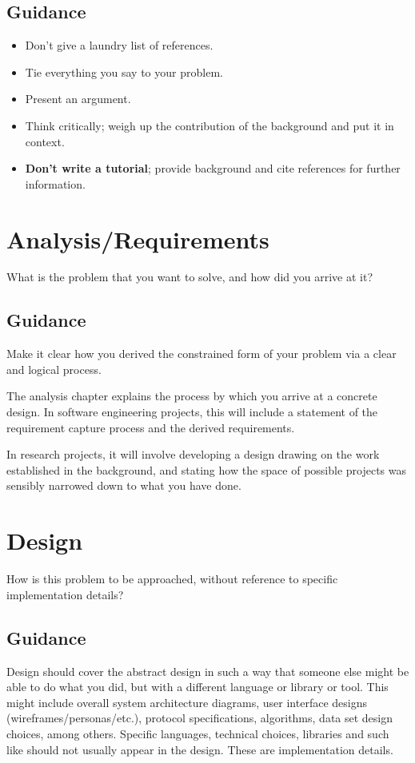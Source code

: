 \documentclass{l4proj}
\begin{document}
\section{Guidance}
\begin{itemize}    
    \item
      Don't give a laundry list of references.
    \item
      Tie everything you say to your problem.
    \item
      Present an argument.
    \item Think critically; weigh up the contribution of the background and put it in context.    
    \item
      \textbf{Don't write a tutorial}; provide background and cite
      references for further information.
\end{itemize}

\chapter{Analysis/Requirements}
What is the problem that you want to solve, and how did you arrive at it?
\section{Guidance}
Make it clear how you derived the constrained form of your problem via a clear and logical process. 

The analysis chapter explains the process by which you arrive at a concrete design. In software 
engineering projects, this will include a statement of the requirement capture process and the
derived requirements.

In research projects, it will involve developing a design drawing on
the work established in the background, and stating how the space of possible projects was
sensibly narrowed down to what you have done.

\chapter{Design}
How is this problem to be approached, without reference to specific implementation details? 
\section{Guidance}
Design should cover the abstract design in such a way that someone else might be able to do what you did, 
but with a different language or library or tool. This might include overall system architecture diagrams,
user interface designs (wireframes/personas/etc.), protocol specifications, algorithms, data set design choices,
among others. Specific languages, technical choices, libraries and such like should not usually appear in the design. These are implementation details.
\end{document}

